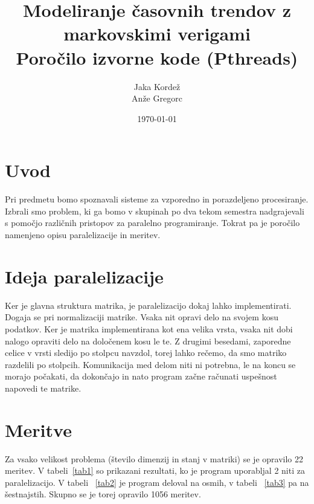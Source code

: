 \documentclass[a4paper,11pt]{article}
\title{Modeliranje časovnih trendov z markovskimi verigami \\ \large  Poročilo izvorne kode (Pthreads)}
\author{Jaka Kordež \\ Anže Gregorc}
\date{\today}
\begin{document}
\maketitle

\section{Uvod}

Pri predmetu bomo spoznavali sisteme za vzporedno in porazdeljeno procesiranje. Izbrali smo problem, ki ga bomo v skupinah po dva tekom semestra nadgrajevali s pomočjo različnih pristopov za paralelno programiranje. Tokrat pa je poročilo namenjeno opisu paralelizacije in meritev.

\section{Ideja paralelizacije}

Ker je glavna struktura matrika, je paralelizacijo dokaj lahko implementirati. Dogaja se pri normalizaciji matrike. Vsaka nit opravi delo na svojem kosu podatkov. Ker je matrika implementirana kot ena velika vrsta, vsaka nit dobi nalogo opraviti delo na določenem kosu le te. Z drugimi besedami, zaporedne celice v vrsti sledijo po stolpcu navzdol, torej lahko rečemo, da smo matriko razdelili po stolpcih. Komunikacija med delom niti ni potrebna, le na koncu se morajo počakati, da dokončajo in nato program začne računati uspešnost napovedi te matrike.

\section{Meritve}
Za vsako velikost problema (število dimenzij in stanj v matriki) se je opravilo 22 meritev. V tabeli~\ref{tab1} so prikazani rezultati, ko je program uporabljal 2 niti za paralelizacijo. V tabeli ~\ref{tab2} je program deloval na osmih, v tabeli ~\ref{tab3} pa na šestnajstih. Skupno se je torej opravilo 1056 meritev.
\end{document}
